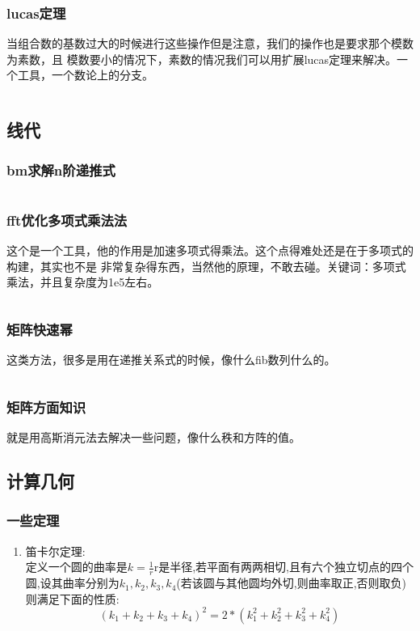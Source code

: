 \documentclass[a4paper,11pt]{article}
\begin{document}
\begin{CJK}{UTF8}{gbsn}
\subsubsection{lucas定理}
当组合数的基数过大的时候进行这些操作但是注意，我们的操作也是要求那个模数为素数，且
模数要小的情况下，素数的情况我们可以用扩展lucas定理来解决。一个工具，一个数论上的分支。
\inputminted{c++}{../scoure/math/lucas.cpp}
\subsection{线代}
\subsubsection{bm求解n阶递推式}
\inputminted{c++}{../scoure/math/bm.cpp}
\subsubsection{fft优化多项式乘法法}
这个是一个工具，他的作用是加速多项式得乘法。这个点得难处还是在于多项式的构建，其实也不是
非常复杂得东西，当然他的原理，不敢去碰。关键词：多项式乘法，并且复杂度为1e5左右。
\inputminted{c++}{../scoure/math/fft.cpp}
\subsubsection{矩阵快速幂}
这类方法，很多是用在递推关系式的时候，像什么fib数列什么的。
\inputminted{c++}{../scoure/math/ju_quick.cpp}
\subsubsection{矩阵方面知识}
就是用高斯消元法去解决一些问题，像什么秩和方阵的值。
\subsection{计算几何}
\subsubsection{一些定理}
\begin{enumerate} %
    \item 笛卡尔定理: \\
    定义一个圆的曲率是$k = \frac{1}{r}$r是半径,若平面有两两相切,且有六个独立切点的四个圆,设其曲率分别为$k_1,k_2,k_3,k_4$(若该圆与其他圆均外切,则曲率取正,否则取负)则满足下面的性质:
    $$(k_1+k_2+k_3+k_4)^2 = 2*(k_1^2+k_2^2+k_3^2+k_4^2)$$
\end{enumerate}

\end{CJK}
\end{document}
